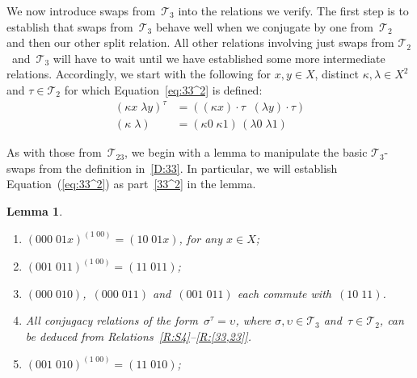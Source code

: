 \documentclass[a4paper,11pt]{article}
\numberwithin{equation}{section}
\newcommand{\eqstate}[1]{Equation~(\ref{#1})}
\newcommand{\nbd}{\nobreakdash-}
\newcommand{\swap}[2]{(#1\;#2)}
\newcommand{\Sw}[1]{\mathcal{T}_{#1}}
\newtheorem{lemma}[thm]{Lemma}
\begin{document}
We now introduce swaps from~$\Sw{3}$ into the relations we verify.
The first step is to establish that swaps from~$\Sw{3}$ behave well
when we conjugate by one from~$\Sw{2}$ and then our other split
relation.  All other relations involving just swaps from
$\Sw{2}$~and~$\Sw{3}$ will have to wait until we have established some
more intermediate relations.  Accordingly, we start with the following
for $x,y \in X$, distinct $\kappa,\lambda \in X^{2}$ and $\tau \in
\Sw{2}$ for which Equation~\eqref{eq:33^2} is defined:
\begin{align}
  \swap{\kappa x}{\lambda y}^{\tau} &=
  \swap{(\kappa x)\!\cdot\!\tau\;}{(\lambda y)\!\cdot\!\tau}
  \label{eq:33^2}
  \\
  \swap{\kappa}{\lambda} &=
  \swap{\kappa0}{\kappa1} \, \swap{\lambda0}{\lambda1}
  \label{eq:22-split}
\end{align}

As with those from~$\Sw{23}$, we begin with a lemma to manipulate the
basic $\Sw{3}$\nbd swaps from the definition in~\eqref{D:33}.  In
particular, we will establish \eqstate{eq:33^2} as part~\ref{33^2} in
the lemma.

\begin{lemma}
  \label{lem:33help}
  \begin{enumerate}
  \item
    \label{(000,01x)-shrink}
    $\swap{000}{01x}^{\swap{1}{00}} = \swap{10}{01x}$, for any $x \in
    X$;
    
  \item
    \label{(001,011)-shrink}
    $\swap{001}{011}^{\swap{1}{00}} = \swap{11}{011}$;

  \item
    \label{33-commute}
    $\swap{000}{010}$,~$\swap{000}{011}$ and~$\swap{001}{011}$ each
    commute with~$\swap{10}{11}$.

  \item
    \label{33^2}
    All conjugacy relations of the form~$\sigma^{\tau} = \upsilon$,
    where $\sigma,\upsilon \in \Sw{3}$ and~$\tau \in \Sw{2}$, can be
    deduced from Relations~\ref{R:S4}--\ref{R:[33,23]}.

  \item
    \label{(001,010)-shrink}
    $\swap{001}{010}^{\swap{1}{00}} = \swap{11}{010}$;
  \end{enumerate}
\end{lemma}
\end{document}
